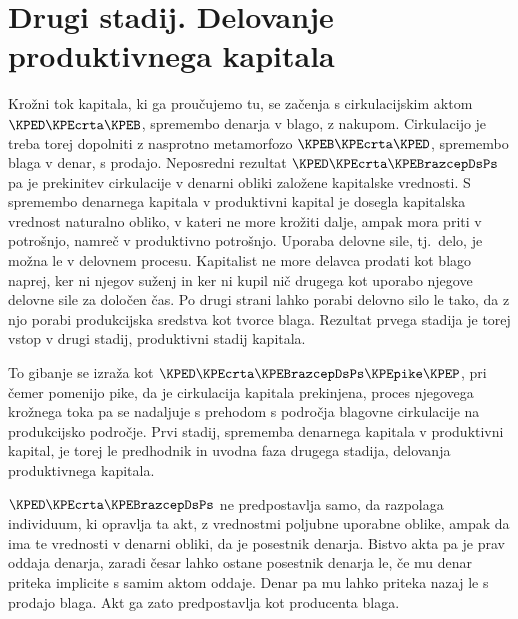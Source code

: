 \documentclass[kapital_02.tex]{subfiles}
\begin{document}
\section{Drugi stadij. Delovanje produktivnega kapitala}

Krožni tok kapitala, ki ga proučujemo tu, se začenja s cirkulacijskim aktom \(\KPED\KPEcrta\KPEB\), spremembo denarja v blago, z nakupom. Cirkulacijo je treba torej dopolniti z nasprotno metamorfozo \KPEstran \(\KPEB\KPEcrta\KPED\), spremembo blaga v denar, s prodajo. Neposredni rezultat \(\KPED\KPEcrta\KPEBrazcepDsPs \) pa je prekinitev cirkulacije v denarni obliki založene kapitalske vrednosti. S spremembo denarnega kapitala v produktivni kapital je dosegla kapitalska vrednost naturalno obliko, v kateri ne more krožiti dalje, ampak mora priti v potrošnjo, namreč v produktivno potrošnjo. Uporaba delovne sile, tj.\ delo, je možna le v delovnem procesu. Kapitalist ne more delavca prodati kot blago naprej, ker ni njegov suženj in ker ni kupil nič drugega kot uporabo njegove delovne sile za določen čas. Po drugi strani lahko porabi delovno silo le tako, da z njo porabi produkcijska sredstva kot tvorce blaga. Rezultat prvega stadija je torej vstop v drugi stadij, produktivni stadij kapitala.

To gibanje se izraža kot \(\KPED\KPEcrta\KPEBrazcepDsPs\KPEpike\KPEP \), pri čemer pomenijo pike, da je cirkulacija kapitala prekinjena, proces njegovega krožnega toka pa se nadaljuje s prehodom s področja blagovne cirkulacije na produkcijsko področje. Prvi stadij, sprememba denarnega kapitala v produktivni kapital, je torej le predhodnik in uvodna faza drugega stadija, delovanja produktivnega kapitala.

\(\KPED\KPEcrta\KPEBrazcepDsPs\) ne predpostavlja samo, da razpolaga individuum, ki opravlja ta akt, z vrednostmi poljubne uporabne oblike, ampak da ima te vrednosti v denarni obliki, da je posestnik denarja. Bistvo akta pa je prav oddaja denarja, zaradi česar lahko ostane posestnik denarja le, če mu denar priteka implicite s samim aktom oddaje. Denar pa mu lahko priteka nazaj le s prodajo blaga. Akt ga zato predpostavlja kot producenta blaga.
\end{document}
